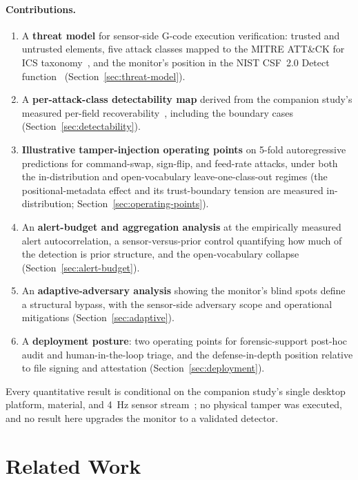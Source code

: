 \documentclass[sensors,article,submit,moreauthors,pdftex]{Definitions/mdpi}
\begin{document}
\paragraph{Contributions.}
\begin{enumerate}[label=\textbf{(\arabic*)}, leftmargin=*]
\item A \textbf{threat model} for sensor-side G-code execution verification: trusted and untrusted elements, five attack classes mapped to the MITRE ATT\&CK for ICS taxonomy~\cite{mitre_attack_ics}, and the monitor's position in the NIST CSF~2.0 Detect function~\cite{nistcsf2} (Section~\ref{sec:threat-model}).
\item A \textbf{per-attack-class detectability map} derived from the companion study's measured per-field recoverability~\cite{decoder_paper}, including the boundary cases (Section~\ref{sec:detectability}).
\item \textbf{Illustrative tamper-injection operating points} on 5-fold autoregressive predictions for command-swap, sign-flip, and feed-rate attacks, under both the in-distribution and open-vocabulary leave-one-class-out regimes (the positional-metadata effect and its trust-boundary tension are measured in-distribution; Section~\ref{sec:operating-points}).
\item An \textbf{alert-budget and aggregation analysis} at the empirically measured alert autocorrelation, a sensor-versus-prior control quantifying how much of the detection is prior structure, and the open-vocabulary collapse (Section~\ref{sec:alert-budget}).
\item An \textbf{adaptive-adversary analysis} showing the monitor's blind spots define a structural bypass, with the sensor-side adversary scope and operational mitigations (Section~\ref{sec:adaptive}).
\item A \textbf{deployment posture}: two operating points for forensic-support post-hoc audit and human-in-the-loop triage, and the defense-in-depth position relative to file signing and attestation (Section~\ref{sec:deployment}).
\end{enumerate}

Every quantitative result is conditional on the companion study's single desktop platform, material, and 4~Hz sensor stream~\cite{decoder_paper}; no physical tamper was executed, and no result here upgrades the monitor to a validated detector.

\section{Related Work}
\label{sec:related}
\end{document}
